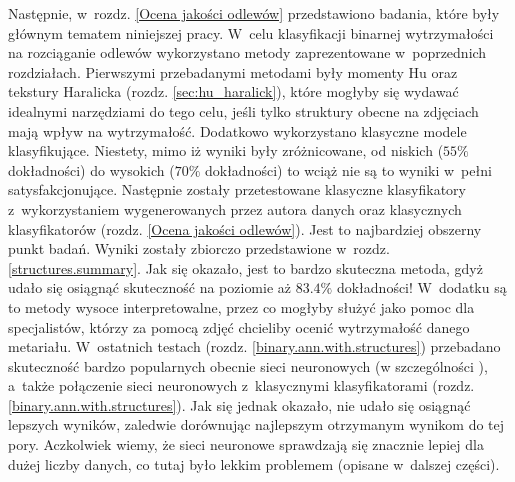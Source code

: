 Następnie, w~rozdz. \ref{Ocena jakości odlewów} przedstawiono badania, które były głównym tematem niniejszej pracy. W~celu klasyfikacji binarnej wytrzymałości na rozciąganie odlewów wykorzystano metody zaprezentowane w~poprzednich rozdziałach. Pierwszymi przebadanymi metodami były momenty Hu oraz tekstury Haralicka (rozdz. \ref{sec:hu_haralick}), które mogłyby się wydawać idealnymi narzędziami do tego celu, jeśli tylko struktury obecne na zdjęciach mają wpływ na wytrzymałość. Dodatkowo wykorzystano klasyczne modele klasyfikujące. Niestety, mimo iż wyniki były zróżnicowane, od niskich ($55\%$ dokładności) do wysokich ($70\%$ dokładności) to wciąż nie są to wyniki w~pełni satysfakcjonujące. Następnie zostały przetestowane klasyczne klasyfikatory z~wykorzystaniem wygenerowanych przez autora danych oraz klasycznych klasyfikatorów (rozdz. \ref{Ocena jakości odlewów}). Jest to najbardziej obszerny punkt badań. Wyniki zostały zbiorczo przedstawione w~rozdz. \ref{structures.summary}. Jak się okazało, jest to bardzo skuteczna metoda, gdyż udało się osiągnąć skuteczność na poziomie aż $83.4\%$ dokładności! W~dodatku są to metody wysoce interpretowalne, przez co mogłyby służyć jako pomoc dla specjalistów, którzy za pomocą zdjęć chcieliby ocenić wytrzymałość danego metariału. W~ostatnich testach (rozdz. \ref{binary.ann.with.structures}) przebadano skuteczność bardzo popularnych obecnie sieci neuronowych (w szczególności ), a~także połączenie sieci neuronowych z~klasycznymi klasyfikatorami (rozdz. \ref{binary.ann.with.structures}). Jak się jednak okazało, nie udało się osiągnąć lepszych wyników, zaledwie dorównując najlepszym otrzymanym wynikom do tej pory. Aczkolwiek wiemy, że sieci neuronowe sprawdzają się znacznie lepiej dla dużej liczby danych, co tutaj było lekkim problemem (opisane w~dalszej części).

